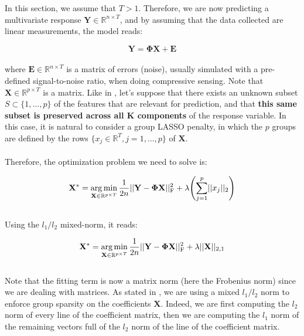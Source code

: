 \documentclass[a4paper,10pt]{article}
\theoremstyle{definition}
\begin{document}
In this section, we assume that $T > 1$. Therefore, we are now predicting a multivariate response $\mathbf{Y}\in \mathbb{R}^{n \times T}$, and by assuming that the data collected are linear measurements, the model reads:

\begin{equation*}
    \mathbf{Y} = \mathbf{\Phi}\mathbf{X} + \mathbf{E}
\end{equation*}
\\
where $\mathbf{E} \in \mathbb{R}^{n \times T}$ is a matrix of errors (noise), usually simulated with a pre-defined signal-to-noise ratio, when doing compressive sensing. Note that $\mathbf{X} \in \mathbb{R}^{p \times T}$ is a matrix.
Like in , let's suppose that there exists an unknown subset $S \subset  \{1, ..., p\}$ of the features that are relevant for prediction, and that \textbf{this same subset is preserved across all K components} of the response
variable. In this case, it is natural to consider a group LASSO penalty, in which the $p$ groups are defined by the rows $\{x_{j} \in \mathbb{R}^T, j=1,...,p\}$ of $\mathbf{X}$.
\\
\\
Therefore, the optimization problem we need to solve is:

\begin{equation*}
    \mathbf{X}^* = \operatorname*{arg\,min}_{\mathbf{X} \in \mathbb{R}^{p \times T}} \frac{1}{2n} \lvert\lvert \mathbf{Y} - \mathbf{\Phi X} \rvert\rvert_{\text{F}}^2 + \lambda \Biggl( \sum_{j=1}^p \lvert\lvert x_{j} \rvert\rvert_2 \Biggr)
\end{equation*}
\\
Using the $l_1/l_2$ mixed-norm, it reads:

\begin{equation*}
    \mathbf{X}^* = \operatorname*{arg\,min}_{\mathbf{X} \in \mathbb{R}^{p \times T}} \frac{1}{2n} \lvert\lvert \mathbf{Y} - \mathbf{\Phi X} \rvert\rvert_{\text{F}}^2 + \lambda \lvert\lvert \mathbf{X} \rvert\rvert_{2, 1}
\end{equation*}
\\
Note that the fitting term is now a matrix norm (here the Frobenius norm) since we are dealing with matrices. As stated in , we are using a mixed $l_1/l_2$ norm to enforce group sparsity on the coefficients $\mathbf{X}$. Indeed,
we are first computing the $l_2$ norm of every line of the coefficient matrix, then we are computing the $l_1$ norm of the remaining vectors full of the $l_2$ norm of the line of the coefficient matrix.
\end{document}
